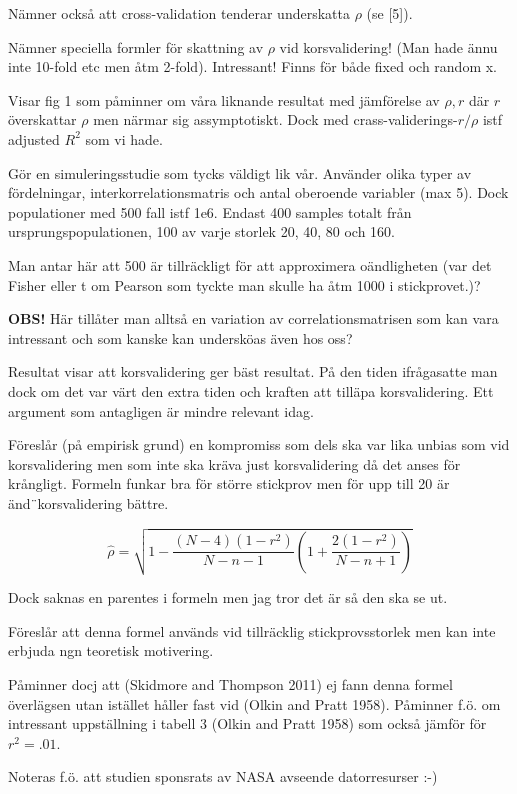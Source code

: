 \documentclass[]{article}
\begin{document}
Nämner också att cross-validation tenderar underskatta \(\rho\) (se
{[}5{]}).

Nämner speciella formler för skattning av \(\rho\) vid korsvalidering!
(Man hade ännu inte 10-fold etc men åtm 2-fold). Intressant! Finns för
både fixed och random x.

Visar fig 1 som påminner om våra liknande resultat med jämförelse av
\(\rho, r\) där \(r\) överskattar \(\rho\) men närmar sig assymptotiskt.
Dock med crass-validerings-\(r/\rho\) istf adjusted \(R^2\) som vi hade.

Gör en simuleringsstudie som tycks väldigt lik vår. Använder olika typer
av fördelningar, interkorrelationsmatris och antal oberoende variabler
(max 5). Dock populationer med 500 fall istf 1e6. Endast 400 samples
totalt från ursprungspopulationen, 100 av varje storlek 20, 40, 80 och
160.

Man antar här att 500 är tillräckligt för att approximera oändligheten
(var det Fisher eller t om Pearson som tyckte man skulle ha åtm 1000 i
stickprovet.)?

\textbf{OBS!} Här tillåter man alltså en variation av
correlationsmatrisen som kan vara intressant och som kanske kan
undersköas även hos oss?

Resultat visar att korsvalidering ger bäst resultat. På den tiden
ifrågasatte man dock om det var värt den extra tiden och kraften att
tilläpa korsvalidering. Ett argument som antagligen är mindre relevant
idag.

Föreslår (på empirisk grund) en kompromiss som dels ska var lika unbias
som vid korsvalidering men som inte ska kräva just korsvalidering då det
anses för krångligt. Formeln funkar bra för större stickprov men för upp
till 20 är änd¨korsvalidering bättre.

\[\hat{\rho} = \sqrt{1 - \frac{(N-4)(1-r^2)}{N-n-1}(1 + \frac{2(1-r^2)}{N-n+1})}\]

Dock saknas en parentes i formeln men jag tror det är så den ska se ut.

Föreslår att denna formel används vid tillräcklig stickprovsstorlek men
kan inte erbjuda ngn teoretisk motivering.

Påminner docj att (Skidmore and Thompson 2011) ej fann denna formel
överlägsen utan istället håller fast vid (Olkin and Pratt 1958).
Påminner f.ö. om intressant uppställning i tabell 3 (Olkin and Pratt
1958) som också jämför för \(r^2=.01\).

Noteras f.ö. att studien sponsrats av NASA avseende datorresurser :-)
\end{document}

